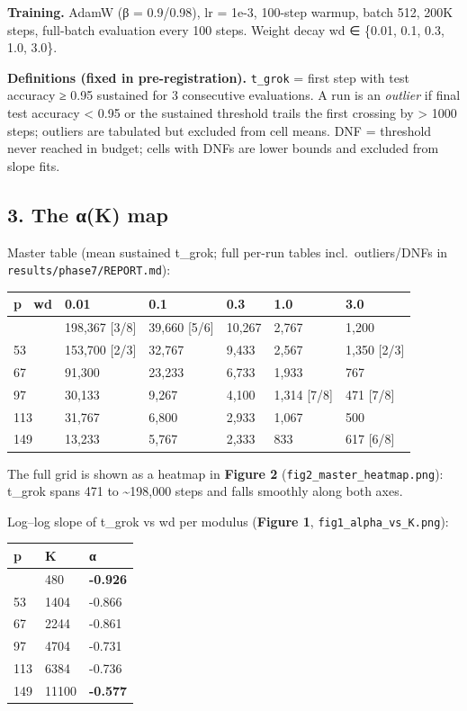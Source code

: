 \documentclass[
  11pt,
]{article}
\newcounter{none} %
\begin{document}
\textbf{Training.} AdamW (β = 0.9/0.98), lr = 1e-3, 100-step warmup,
batch 512, 200K steps, full-batch evaluation every 100 steps. Weight
decay wd ∈ \{0.01, 0.1, 0.3, 1.0, 3.0\}.

\textbf{Definitions (fixed in pre-registration).} \texttt{t\_grok} =
first step with test accuracy ≥ 0.95 sustained for 3 consecutive
evaluations. A run is an \emph{outlier} if final test accuracy
\textless{} 0.95 or the sustained threshold trails the first crossing by
\textgreater{} 1000 steps; outliers are tabulated but excluded from cell
means. DNF = threshold never reached in budget; cells with DNFs are
lower bounds and excluded from slope fits.

\subsection{3. The α(K) map}\label{the-ux3b1k-map}

Master table (mean sustained t\_grok; full per-run tables
incl.~outliers/DNFs in \texttt{results/phase7/REPORT.md}):

{\def\LTcaptype{none} %
\begin{longtable}[]{@{}llllll@{}}
\toprule\noalign{}
p ~wd & 0.01 & 0.1 & 0.3 & 1.0 & 3.0 \\
\midrule\noalign{}
\endhead
\bottomrule\noalign{}
\endlastfoot
31 & 198,367 {[}3/8{]} & 39,660 {[}5/6{]} & 10,267 & 2,767 & 1,200 \\
53 & 153,700 {[}2/3{]} & 32,767 & 9,433 & 2,567 & 1,350 {[}2/3{]} \\
67 & 91,300 & 23,233 & 6,733 & 1,933 & 767 \\
97 & 30,133 & 9,267 & 4,100 & 1,314 {[}7/8{]} & 471 {[}7/8{]} \\
113 & 31,767 & 6,800 & 2,933 & 1,067 & 500 \\
149 & 13,233 & 5,767 & 2,333 & 833 & 617 {[}6/8{]} \\
\end{longtable}
}

The full grid is shown as a heatmap in \textbf{Figure 2}
(\texttt{fig2\_master\_heatmap.png}): t\_grok spans 471 to
\textasciitilde198,000 steps and falls smoothly along both axes.

Log--log slope of t\_grok vs wd per modulus (\textbf{Figure 1},
\texttt{fig1\_alpha\_vs\_K.png}):

{\def\LTcaptype{none} %
\begin{longtable}[]{@{}lll@{}}
\toprule\noalign{}
p & K & α \\
\midrule\noalign{}
\endhead
\bottomrule\noalign{}
\endlastfoot
31 & 480 & \textbf{-0.926} \\
53 & 1404 & -0.866 \\
67 & 2244 & -0.861 \\
97 & 4704 & -0.731 \\
113 & 6384 & -0.736 \\
149 & 11100 & \textbf{-0.577} \\
\end{longtable}
}
\end{document}

